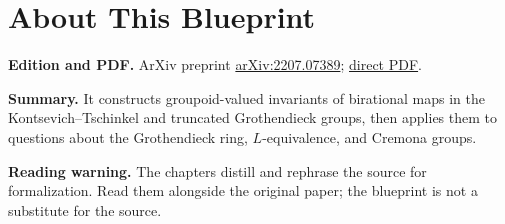 

\chapter*{About This Blueprint}
\label{motivic-invariants-birational-maps-about}


\textbf{Edition and PDF.} ArXiv preprint \href{https://arxiv.org/abs/2207.07389}{arXiv:2207.07389}; \href{https://arxiv.org/pdf/2207.07389}{direct PDF}.

\textbf{Summary.} It constructs groupoid-valued invariants of birational maps in the Kontsevich--Tschinkel and truncated Grothendieck groups, then applies them to questions about the Grothendieck ring, $L$-equivalence, and Cremona groups.

\textbf{Reading warning.} The chapters distill and rephrase the source for formalization. Read them alongside the original paper; the blueprint is not a substitute for the source.










